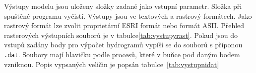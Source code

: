 






Výstupy modelu jsou uloženy složky zadané jako vstupní parametr. Složka při spuštěné programu vyčistí. Výstupy jsou ve textových a rastrový formátech. Jako rastrový formát lze zvolit proprietární ESRI formát nebo formát ASII. Přehled rasterových výstupních souborů je v tabulce\ref{tab:vystupyrast}. Pokud jsou do vstupů zadány body pro výpočet hydrogramů vypíší se do souborů s příponou {\tt.dat}. Soubory mají hlavičku podle procesů, které v buňce pod daným bodem vzniknou. Popis vypsaných veličin je popsán tabulce~\ref{tab:vystupnidat}









